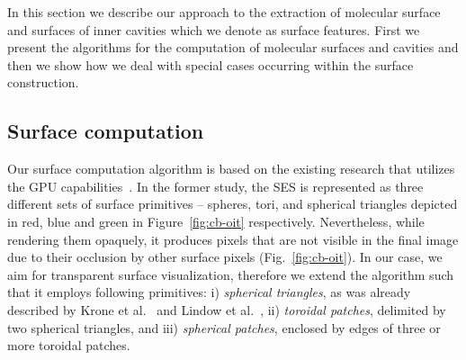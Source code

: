 In this section we describe our approach to the extraction of molecular surface and surfaces of inner cavities which we denote as surface features.
First we present the algorithms for the computation of molecular surfaces and cavities and then we show how we deal with special cases occurring within the surface construction.

\subsection{Surface computation}
\label{sec:ecb}
Our surface computation algorithm is based on the existing research that utilizes the GPU capabilities~\cite{krone2011parallel}.
In the former study, the SES is represented as three different sets of surface primitives -- spheres, tori, and spherical triangles depicted in red, blue and green in Figure~\ref{fig:cb-oit} respectively.
Nevertheless, while rendering them opaquely, it produces pixels that are not visible in the final image due to their occlusion by other surface pixels (Fig.~\ref{fig:cb-oit}).
In our case, we aim for transparent surface visualization, therefore we extend the algorithm such that it employs following primitives:
i) \textit{spherical triangles}, as was already described by Krone et al.~\cite{krone2011parallel} and Lindow et al.~\cite{lindow2010accelerated}, ii)
\textit{toroidal patches}, delimited by two spherical triangles, and iii) \textit{spherical patches}, enclosed by edges of three or more toroidal patches.


